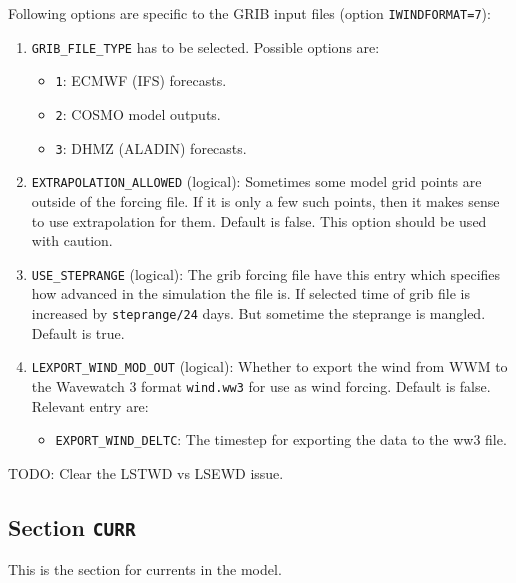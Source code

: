 \documentclass[12pt]{amsart}
\begin{document}
Following options are specific to the GRIB input files (option {\tt IWINDFORMAT=7}):
\begin{enumerate}
\item {\tt GRIB\_FILE\_TYPE} has to be selected. Possible options are:
  \begin{itemize}
  \item {\tt 1}: ECMWF (IFS) forecasts.
  \item {\tt 2}: COSMO model outputs.
  \item {\tt 3}: DHMZ (ALADIN) forecasts.
  \end{itemize}
\item {\tt EXTRAPOLATION\_ALLOWED} (logical): Sometimes some model grid points are outside of the forcing file. If it is only a few such points, then it makes sense to use extrapolation for them. Default is false. This option should be used with caution.
\item {\tt USE\_STEPRANGE} (logical): The grib forcing file have this entry which specifies how advanced in the simulation the file is. If selected time of grib file is increased by {\tt steprange/24} days. But sometime the steprange is mangled. Default is true.
\item {\tt LEXPORT\_WIND\_MOD\_OUT} (logical): Whether to export the wind from WWM to the Wavewatch 3 format {\tt wind.ww3} for use as wind forcing. Default is false. Relevant entry are:
  \begin{itemize}
  \item {\tt EXPORT\_WIND\_DELTC}: The timestep for exporting the data to the ww3 file.
  \end{itemize}
  
\end{enumerate}

TODO: Clear the LSTWD vs LSEWD issue.



\newpage

\subsection{Section {\tt CURR}}
This is the section for currents in the model.
\end{document}
